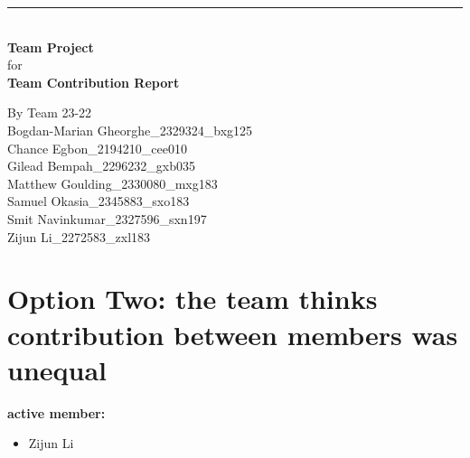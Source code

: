 \documentclass[a4paper]{article}
\begin{document}

\begin{titlepage}
	
	\rule{\linewidth}{5pt}
	\raggedleft
	\fontsize{38pt}{50pt}\selectfont
    \textbf{\\Team Project\\}
    \fontsize{28pt}{60pt}\selectfont 
    for\\
    \fontsize{38pt}{60pt}\selectfont 
    \textbf{Team Contribution Report\\}
	
	\vfill %
	
	
	\parbox[t]{0.93\textwidth}{ %
		\raggedleft %
		\large %
		{\Large By Team 23-22}\\[4pt] %
		Bogdan-Marian Gheorghe\_2329324\_bxg125\\
		Chance Egbon\_2194210\_cee010\\
		Gilead Bempah\_2296232\_gxb035\\
		Matthew Goulding\_2330080\_mxg183\\
		Samuel Okasia\_2345883\_sxo183\\
		Smit Navinkumar\_2327596\_sxn197\\
		Zijun Li\_2272583\_zxl183\\
	}
	
\end{titlepage}

\section*{Option Two: the team thinks contribution between members was unequal}

\textbf{active member: }
\begin{itemize}
    \item Zijun Li
\end{itemize}
\end{document}
